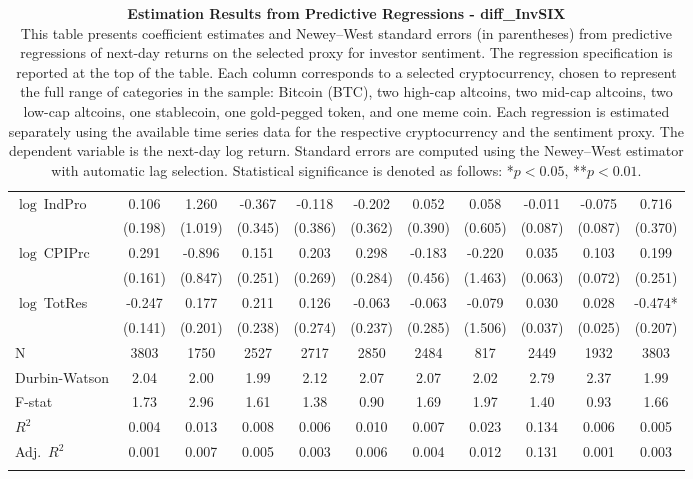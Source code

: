\begin{table}[ht]
\begin{tabular}{l *{10}{c}}
\addlinespace
$\log\ $IndPro & 0.106 & 1.260 & -0.367 & -0.118 & -0.202 & 0.052 & 0.058 & -0.011 & -0.075 & 0.716 \\
 & (0.198) & (1.019) & (0.345) & (0.386) & (0.362) & (0.390) & (0.605) & (0.087) & (0.087) & (0.370) \\
\addlinespace
$\log\ $CPIPrc & 0.291 & -0.896 & 0.151 & 0.203 & 0.298 & -0.183 & -0.220 & 0.035 & 0.103 & 0.199 \\
 & (0.161) & (0.847) & (0.251) & (0.269) & (0.284) & (0.456) & (1.463) & (0.063) & (0.072) & (0.251) \\
\addlinespace
$\log\ $TotRes & -0.247 & 0.177 & 0.211 & 0.126 & -0.063 & -0.063 & -0.079 & 0.030 & 0.028 & -0.474* \\
 & (0.141) & (0.201) & (0.238) & (0.274) & (0.237) & (0.285) & (1.506) & (0.037) & (0.025) & (0.207) \\
\addlinespace
\midrule
N & 3803 & 1750 & 2527 & 2717 & 2850 & 2484 & 817 & 2449 & 1932 & 3803 \\
Durbin-Watson & 2.04 & 2.00 & 1.99 & 2.12 & 2.07 & 2.07 & 2.02 & 2.79 & 2.37 & 1.99 \\
F-stat & 1.73 & 2.96 & 1.61 & 1.38 & 0.90 & 1.69 & 1.97 & 1.40 & 0.93 & 1.66 \\
\(R^2\) & 0.004 & 0.013 & 0.008 & 0.006 & 0.010 & 0.007 & 0.023 & 0.134 & 0.006 & 0.005 \\
Adj.\ \(R^2\) & 0.001 & 0.007 & 0.005 & 0.003 & 0.006 & 0.004 & 0.012 & 0.131 & 0.001 & 0.003 \\
\addlinespace
\midrule
\multicolumn{11}{c}{Specification tested: $R_{i,t+1} = \alpha_i + \beta_{sent} S_t + \phi R_{i,t} + \theta B_{i,t} + \gamma M_t + \varepsilon_{i,t+1}$}\\
\bottomrule
\end{tabular}
\caption{\textbf{Estimation Results from Predictive Regressions - diff_InvSIX} \\
This table presents coefficient estimates and Newey--West standard errors (in parentheses) from predictive regressions of next-day returns on the selected proxy for investor sentiment. The regression specification is reported at the top of the table. Each column corresponds to a selected cryptocurrency, chosen to represent the full range of categories in the sample: Bitcoin (BTC), two high-cap altcoins, two mid-cap altcoins, two low-cap altcoins, one stablecoin, one gold-pegged token, and one meme coin. Each regression is estimated separately using the available time series data for the respective cryptocurrency and the sentiment proxy. The dependent variable is the next-day log return. Standard errors are computed using the Newey--West estimator with automatic lag selection. Statistical significance is denoted as follows: *$p<0.05$, **$p<0.01$.}
\label{tab:diff_invsix_result_h1}
\end{table}